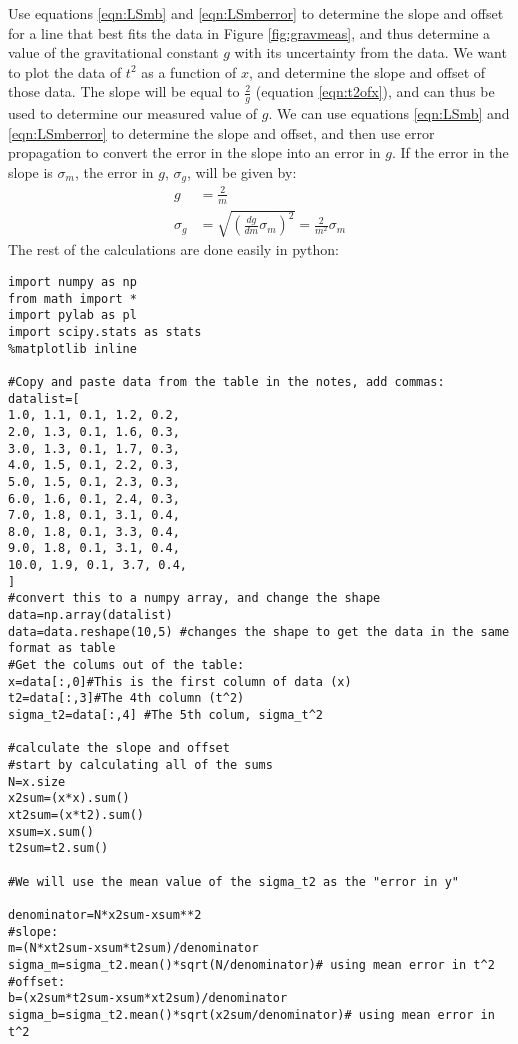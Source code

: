\begin{example}{}{Use equations \ref{eqn:LSmb} and \ref{eqn:LSmberror} to determine the slope and offset for a line that best fits the data in Figure \ref{fig:gravmeas}, and thus determine a value of the gravitational constant $g$ with its uncertainty from the data.}{}
\label{ex:gravLMfit}
We want to plot the data of $t^2$ as a function of $x$, and determine the slope and offset of those data. The slope will be equal to $\frac{2}{g}$ (equation \ref{eqn:t2ofx}), and can thus be used to determine our measured value of $g$. We can use equations \ref{eqn:LSmb} and \ref{eqn:LSmberror} to determine the slope and offset, and then use error propagation to convert the error in the slope into an error in $g$. If the error in the slope is $\sigma_m$, the error in $g$, $\sigma_g$, will be given by:
\begin{align*}
g&=\frac{2}{m}\\
\sigma_g&=\sqrt{\left(\frac{dg}{dm}\sigma_m\right)^2}=\frac{2}{m^2}\sigma_m
\end{align*}
The rest of the calculations are done easily in python:
\clearpage
\begin{lstlisting}[frame=single] 
import numpy as np
from math import *
import pylab as pl
import scipy.stats as stats
%matplotlib inline

#Copy and paste data from the table in the notes, add commas:
datalist=[
1.0, 1.1, 0.1, 1.2, 0.2,
2.0, 1.3, 0.1, 1.6, 0.3,
3.0, 1.3, 0.1, 1.7, 0.3,
4.0, 1.5, 0.1, 2.2, 0.3,
5.0, 1.5, 0.1, 2.3, 0.3,
6.0, 1.6, 0.1, 2.4, 0.3,
7.0, 1.8, 0.1, 3.1, 0.4,
8.0, 1.8, 0.1, 3.3, 0.4,
9.0, 1.8, 0.1, 3.1, 0.4,
10.0, 1.9, 0.1, 3.7, 0.4,
]
#convert this to a numpy array, and change the shape
data=np.array(datalist)
data=data.reshape(10,5) #changes the shape to get the data in the same format as table
#Get the colums out of the table:
x=data[:,0]#This is the first column of data (x)
t2=data[:,3]#The 4th column (t^2)
sigma_t2=data[:,4] #The 5th colum, sigma_t^2

#calculate the slope and offset
#start by calculating all of the sums
N=x.size
x2sum=(x*x).sum()
xt2sum=(x*t2).sum()
xsum=x.sum()
t2sum=t2.sum()

#We will use the mean value of the sigma_t2 as the "error in y"

denominator=N*x2sum-xsum**2
#slope:
m=(N*xt2sum-xsum*t2sum)/denominator
sigma_m=sigma_t2.mean()*sqrt(N/denominator)# using mean error in t^2
#offset:
b=(x2sum*t2sum-xsum*xt2sum)/denominator
sigma_b=sigma_t2.mean()*sqrt(x2sum/denominator)# using mean error in t^2


\end{lstlisting}
\end{example}
